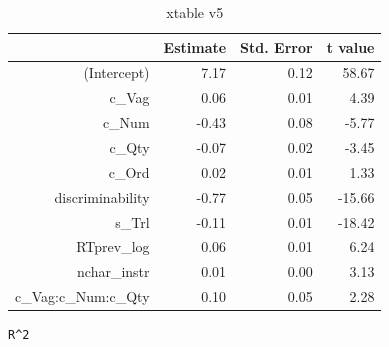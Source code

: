\documentclass[a4paper,12pt,twoside]{article}\usepackage[]{graphicx}\usepackage[]{color}
\makeatletter
\newenvironment{kframe}{%
 \def\at@end@of@kframe{}%
 \ifinner\ifhmode%
  \def\at@end@of@kframe{\end{minipage}}%
  \begin{minipage}{\columnwidth}%
 \fi\fi%
 \def\FrameCommand##1{\hskip\@totalleftmargin \hskip-\fboxsep
 \colorbox{shadecolor}{##1}\hskip-\fboxsep
     \hskip-\linewidth \hskip-\@totalleftmargin \hskip\columnwidth}%
 \MakeFramed {\advance\hsize-\width
   \@totalleftmargin\z@ \linewidth\hsize
   \@setminipage}}%
 {\par\unskip\endMakeFramed%
 \at@end@of@kframe}
\newenvironment{knitrout}{}{} %
\makeatother
\begin{document}
\clearpage

\begin{table}[htbp]
\centering
\begingroup\small
\begin{tabular}{rrrr}
  \hline
 & Estimate & Std. Error & t value \\ 
  \hline
(Intercept) & 7.17 & 0.12 & 58.67 \\ 
  c\_Vag & 0.06 & 0.01 & 4.39 \\ 
  c\_Num & -0.43 & 0.08 & -5.77 \\ 
  c\_Qty & -0.07 & 0.02 & -3.45 \\ 
  c\_Ord & 0.02 & 0.01 & 1.33 \\ 
  discriminability & -0.77 & 0.05 & -15.66 \\ 
  s\_Trl & -0.11 & 0.01 & -18.42 \\ 
  RTprev\_log & 0.06 & 0.01 & 6.24 \\ 
  nchar\_instr & 0.01 & 0.00 & 3.13 \\ 
  c\_Vag:c\_Num:c\_Qty & 0.10 & 0.05 & 2.28 \\ 
   \hline
\end{tabular}
\endgroup
\caption{xtable v5} 
\end{table}


\begin{knitrout}\scriptsize
{}\color{fgcolor}\begin{kframe}
\begin{verbatim}
R^2
\end{verbatim}


{\ttfamily\noindent\bfseries\color{errorcolor}{Error in cor(fitted(v5), dd\$RT\_log): supply both 'x' and 'y' or a matrix-like 'x'}}\end{kframe}
\end{knitrout}

\end{document}
